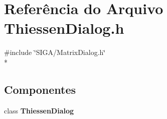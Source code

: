 \section{Referência do Arquivo Thiessen\+Dialog.\+h}
\label{_thiessen_dialog_8h}
{\ttfamily \#include \char`\"{}S\+I\+G\+A/\+Matrix\+Dialog.\+h\char`\"{}}\\*
\subsection*{Componentes}
\begin{DoxyCompactItemize}
\item 
class {\bf Thiessen\+Dialog}
\end{DoxyCompactItemize}
